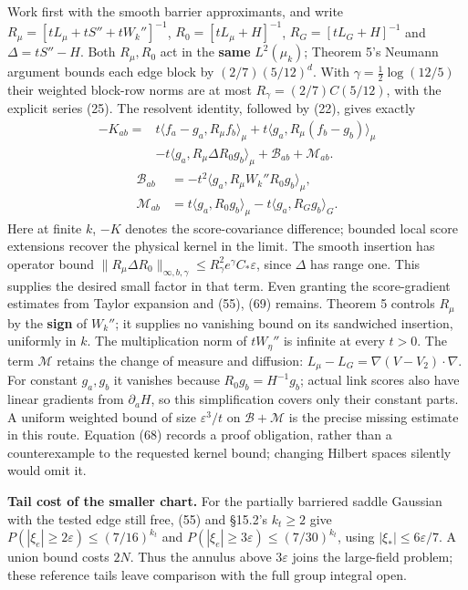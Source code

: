 \documentclass[11pt,a4paper]{article}
\begin{document}
Work first with the smooth barrier approximants, and write
\(R_\mu=[tL_\mu+tS''+tW_k'']^{-1}\), \(R_0=[tL_\mu+H]^{-1}\),
\(R_G=[tL_G+H]^{-1}\) and \(\Delta=tS''-H\). Both \(R_\mu,R_0\) act in
the \textbf{same} \(L^2(\mu_k)\); Theorem 5's Neumann argument bounds
each edge block by \((2/7)(5/12)^d\). With \(\gamma=\frac12\log(12/5)\)
their weighted block-row norms are at most \(R_\gamma=(2/7)C(5/12)\),
with the explicit series (25). The resolvent identity, followed by (22),
gives exactly \[\begin{aligned}
-K_{ab}={}&t\langle f_a-g_a,R_\mu f_b\rangle_\mu
+t\langle g_a,R_\mu(f_b-g_b)\rangle_\mu\\
&-t\langle g_a,R_\mu\Delta R_0g_b\rangle_\mu
+\mathcal B_{ab}+\mathcal M_{ab}.\end{aligned}\tag{68}\]
\[\begin{aligned}
\mathcal B_{ab}&=-t^2\langle g_a,R_\mu W_k''R_0g_b\rangle_\mu,\\
\mathcal M_{ab}&=t\langle g_a,R_0g_b\rangle_\mu
-t\langle g_a,R_Gg_b\rangle_G.\end{aligned}\tag{69}\] Here at finite
\(k\), \(-K\) denotes the score-covariance difference; bounded local
score extensions recover the physical kernel in the limit. The smooth
insertion has operator bound
\(\|R_\mu\Delta R_0\|_{\infty,b,\gamma}\le R_\gamma^2 e^\gamma C_*\varepsilon\),
since \(\Delta\) has range one. This supplies the desired small factor
in that term. Even granting the score-gradient estimates from Taylor
expansion and (55), (69) remains. Theorem 5 controls \(R_\mu\) by the
\textbf{sign} of \(W_k''\); it supplies no vanishing bound on its
sandwiched insertion, uniformly in \(k\). The multiplication norm of
\(tW_\eta''\) is infinite at every \(t>0\). The term \(\mathcal M\)
retains the change of measure and diffusion:
\(L_\mu-L_G=\nabla(V-V_2)\cdot\nabla\). For constant \(g_a,g_b\) it
vanishes because \(R_0g_b=H^{-1}g_b\); actual link scores also have
linear gradients from \(\partial_aH\), so this simplification covers
only their constant parts. A uniform weighted bound of size
\(\varepsilon^3/t\) on \(\mathcal B+\mathcal M\) is the precise missing
estimate in this route. Equation (68) records a proof obligation, rather
than a counterexample to the requested kernel bound; changing Hilbert
spaces silently would omit it.

\textbf{Tail cost of the smaller chart.} For the partially barriered
saddle Gaussian with the tested edge still free, (55) and §15.2's
\(k_t\ge2\) give \(P(|\xi_e|\ge2\varepsilon)\le(7/16)^{k_t}\) and
\(P(|\xi_e|\ge3\varepsilon)\le(7/30)^{k_t}\), using
\(|\xi_*|\le6\varepsilon/7\). A union bound costs \(2N\). Thus the
annulus above \(3\varepsilon\) joins the large-field problem; these
reference tails leave comparison with the full group integral open.
\end{document}
